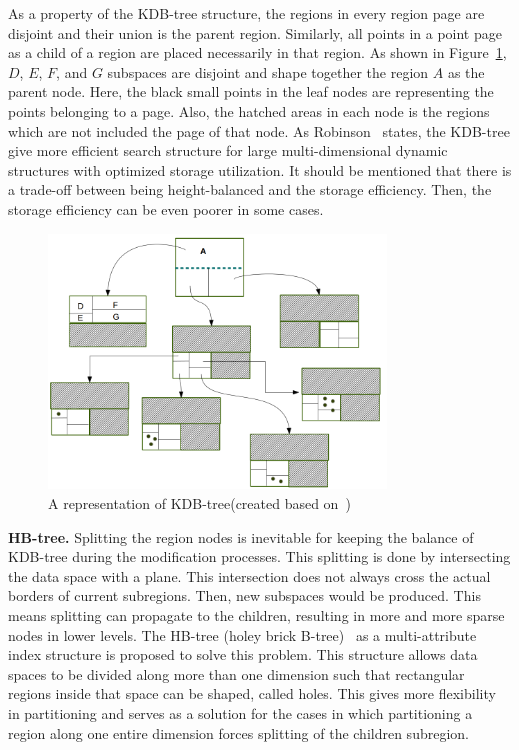 \documentclass[a4paper,12pt]{article}
\begin{document}
As a property of the KDB-tree structure, the regions in every region page are disjoint and their union is the parent region. %
Similarly, all points in a point page as a child of a region are placed necessarily in that region.
As shown in Figure~\ref{figkdbtree}, $D$, $E$, $F$, and $G$ subspaces are disjoint and shape together the region $A$ as the parent node. Here, the black small points in the leaf nodes are representing the points belonging to a page. Also, the hatched areas in each node is the regions which are not included the page of that node. 
As Robinson~\cite{kdbtree} states, the KDB-tree give more efficient search structure for large multi-dimensional dynamic structures with optimized storage utilization. It should be mentioned that there is a trade-off between being height-balanced and the storage efficiency. Then, the storage efficiency can be even poorer in some cases.

\begin{figure}
\centering
\includegraphics[width=0.8\textwidth]{kdbtree}
\caption{A representation of KDB-tree(created based on~\cite{kdbtree})}
\label{figkdbtree}
\end{figure}

\textbf{HB-tree.} 
Splitting the region nodes is inevitable for keeping the balance of KDB-tree during the modification processes. This splitting is done by intersecting the data space with a plane. This intersection does not always cross the actual borders of current subregions. Then, new subspaces would be produced. This means splitting can propagate to the children, resulting in more and more sparse nodes in lower levels. The HB-tree (holey brick B-tree)~\cite{hbtree1} as a multi-attribute index structure is proposed to solve this problem. This structure allows data spaces to be divided along more than one dimension such that rectangular regions inside that space can be shaped, called holes.
This gives more flexibility in partitioning and serves as a solution for the cases in which partitioning a region along one entire dimension forces splitting of the children subregion. 
\end{document}
